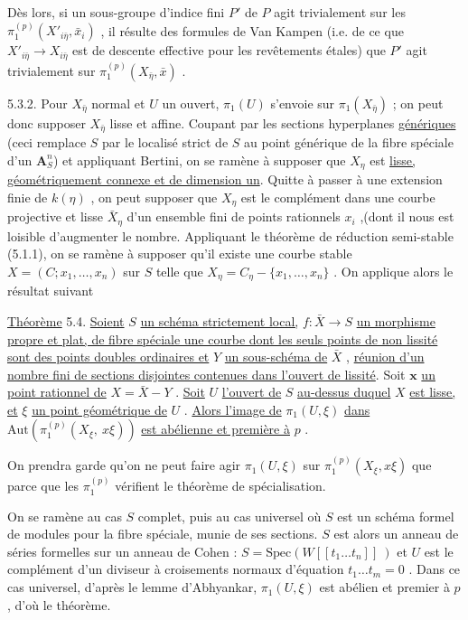 Dès lors, si un sous-groupe d'indice fini $P'$ de $P$ agit trivialement sur les $\pi_1^{(p)}(X'_{i\bar{\eta}},\bar{x}_i)$ , il résulte des formules de Van Kampen (i.e. de ce que $X'_{i\bar{\eta}} \longrightarrow X_{i\bar{\eta}}$ est de descente effective pour les revêtements étales) que $P'$ agit trivialement sur $\pi_1^{(p)}(X_{\bar{\eta}},\bar{x})$ .

5.3.2. Pour $X_{\bar{\eta}}$ normal et $U$ un ouvert, $\pi_1(U)$ s'envoie sur $\pi_1(X_{\bar{\eta}})$ ; on peut donc supposer $X_{\bar{\eta}}$ lisse et affine. Coupant par les sections hyperplanes \underline{génériques} (ceci remplace $S$ par le localisé strict de $S$ au point générique de la fibre spéciale d'un $\mathbf{A}^n_S$) et appliquant Bertini, on se ramène à supposer que $X_\eta$ est \underline{lisse, géométriquement connexe et de dimension un}. Quitte à passer à une extension finie de $k(\eta)$ , on peut supposer que $X_\eta$ est le complément dans une courbe projective et lisse $\bar{X}_\eta$ d'un ensemble fini de points rationnels $x_i$ ,(dont il nous est loisible d'augmenter le nombre. Appliquant le théorème de réduction semi-stable (5.1.1), on se ramène à supposer qu'il existe une courbe stable $X = (C ; x_1 ,\ldots, x_n)$ sur $S$ telle que $X_\eta = C_\eta - \{x_1 ,\ldots, x_n\}$ . On applique alors le résultat suivant



\underline{Théorème} 5.4. \underline{Soient} $S$ \underline{un schéma strictement local,} $f : \bar{X} \longrightarrow S$ \underline{un morphisme propre et plat, de fibre spéciale une courbe dont les seuls points de non lissité sont des points doubles ordinaires et} $Y$ \underline{un sous-schéma de} $\bar{X}$ , \underline{réunion d'un nombre fini de sections disjointes contenues dans l'ouvert de lissité}. Soit $\mathbf{x}$ \underline{un point rationnel de} $X = \bar{X} - Y$ . \underline{Soit} $U$ \underline{l'ouvert de} $S$ \underline{au-dessus duquel} $X$ \underline{est lisse, et} $\xi$ \underline{un point géométrique de} $U$ . \underline{Alors l'image de} $\pi_1(U,\xi)$ \underline{dans} $\mathrm{Aut}(\pi_1^{(p)}(X_\xi,\ x\xi))$ \underline{est abélienne et première à} $p$ .

On prendra garde qu'on ne peut faire agir $\pi_1(U,\xi)$ sur $\pi_1^{(p)}(X_\xi,x\xi)$ que parce que les $\pi_1^{(p)}$ vérifient le théorème de spécialisation.

On se ramène au cas $S$ complet, puis au cas universel où $S$ est un schéma formel de modules pour la fibre spéciale, munie de ses sections. $S$ est alors un anneau de séries formelles sur un anneau de Cohen : $S = \mathrm{Spec}(W[[t_1 \ldots t_n]]\ )$ et $U$ est le complément d'un diviseur à croisements normaux d'équation $t_1 \ldots t_m = 0$ . Dans ce cas universel, d'après le lemme d'Abhyankar, $\pi_1(U,\xi)$ est abélien et premier à $p$ , d'où le théorème.


